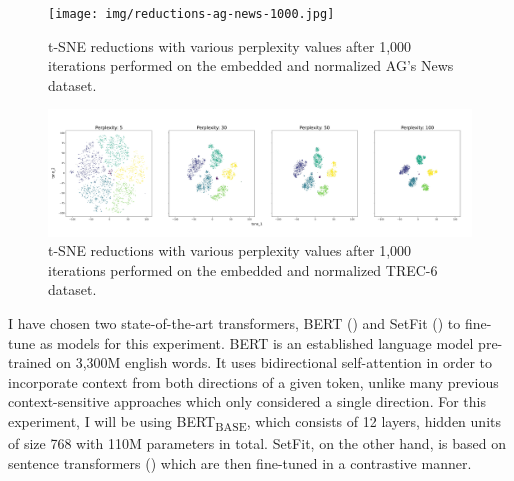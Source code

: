 \documentclass[english,bachelor,ul]{webisthesis} %
\begin{document}
\begin{figure}[htbp]
    \centering
    \texttt{[image: img/reductions-ag-news-1000.jpg]}
    \caption{t-SNE reductions with various perplexity values after 1,000 iterations performed on the embedded and normalized AG's News dataset.}
    \label{fig:reductions-agnews-1000}
\end{figure}

\begin{figure}[htbp]
    \centering
    \includegraphics[width=1\textwidth]{img/reductions-trec-1000.jpg}
    \caption{t-SNE reductions with various perplexity values after 1,000 iterations performed on the embedded and normalized TREC-6 dataset.}
    \label{fig:reductions-trec-1000}
\end{figure}

\fi



I have chosen two state-of-the-art transformers, BERT (\cite{DBLP:conf/naacl/DevlinCLT19}) and SetFit (\cite{DBLP:setfit}) to fine-tune as models for this experiment. BERT is an established language model pre-trained on 3,300M english words. It uses bidirectional self-attention in order to incorporate context from both directions of a given token, unlike many previous context-sensitive approaches which only considered a single direction. For this experiment, I will be using BERT\textsubscript{BASE}, which consists of 12 layers, hidden units of size 768 with 110M parameters in total. SetFit, on the other hand, is based on sentence transformers (\cite{DBLP:conf/emnlp/ReimersG19}) which are then fine-tuned in a contrastive manner.
\end{document}
